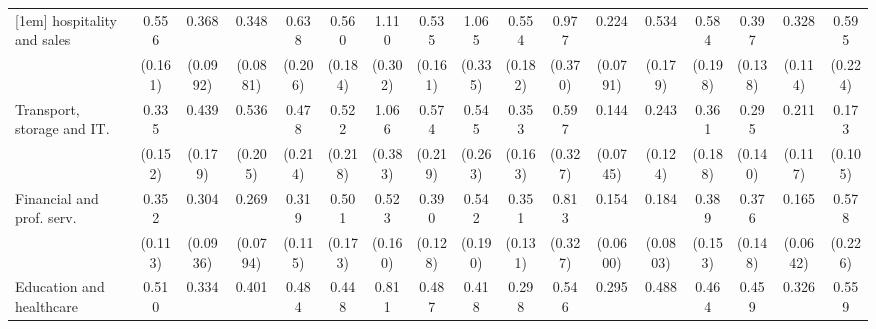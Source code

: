 {\begin{tabular}{l*{16}{c}}
[1em]
hospitality and sales&       0.556\sym{*}  &       0.368\sym{***}&       0.348\sym{***}&       0.638         &       0.560         &       1.110         &       0.535\sym{*}  &       1.065         &       0.554         &       0.977         &       0.224\sym{***}&       0.534         &       0.584         &       0.397\sym{**} &       0.328\sym{**} &       0.595         \\
                    &     (0.161)         &    (0.0992)         &    (0.0881)         &     (0.206)         &     (0.184)         &     (0.302)         &     (0.161)         &     (0.335)         &     (0.182)         &     (0.370)         &    (0.0791)         &     (0.179)         &     (0.198)         &     (0.138)         &     (0.114)         &     (0.224)         \\
[1em]
Transport, storage and IT.&       0.335\sym{*}  &       0.439\sym{*}  &       0.536         &       0.478         &       0.522         &       1.066         &       0.574         &       0.545         &       0.353\sym{*}  &       0.597         &       0.144\sym{***}&       0.243\sym{**} &       0.361         &       0.295\sym{**} &       0.211\sym{**} &       0.173\sym{**} \\
                    &     (0.152)         &     (0.179)         &     (0.205)         &     (0.214)         &     (0.218)         &     (0.383)         &     (0.219)         &     (0.263)         &     (0.163)         &     (0.327)         &    (0.0745)         &     (0.124)         &     (0.188)         &     (0.140)         &     (0.117)         &     (0.105)         \\
[1em]
Financial and prof. serv.&       0.352\sym{**} &       0.304\sym{***}&       0.269\sym{***}&       0.319\sym{**} &       0.501\sym{*}  &       0.523\sym{*}  &       0.390\sym{**} &       0.542         &       0.351\sym{**} &       0.813         &       0.154\sym{***}&       0.184\sym{***}&       0.389\sym{*}  &       0.376\sym{*}  &       0.165\sym{***}&       0.578         \\
                    &     (0.113)         &    (0.0936)         &    (0.0794)         &     (0.115)         &     (0.173)         &     (0.160)         &     (0.128)         &     (0.190)         &     (0.131)         &     (0.327)         &    (0.0600)         &    (0.0803)         &     (0.153)         &     (0.148)         &    (0.0642)         &     (0.226)         \\
[1em]
Education and healthcare&       0.510\sym{*}  &       0.334\sym{***}&       0.401\sym{**} &       0.484\sym{*}  &       0.448\sym{*}  &       0.811         &       0.487\sym{*}  &       0.418\sym{*}  &       0.298\sym{***}&       0.546         &       0.295\sym{***}&       0.488         &       0.464\sym{*}  &       0.459\sym{*}  &       0.326\sym{**} &       0.559         \\

\end{tabular}}
